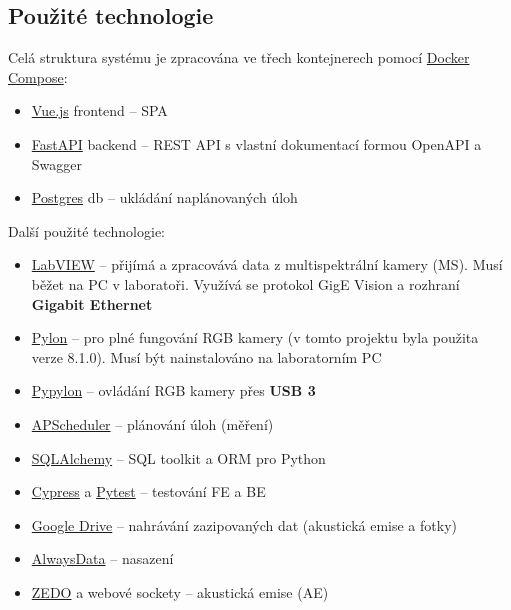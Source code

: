 \documentclass[12pt]{article}
\begin{document}
\begin{teamwork}
        \subsection{Použité technologie}\label{subsec:techstack}

        Celá struktura systému je zpracována ve třech kontejnerech pomocí \href{https://docs.docker.com/compose/}{Docker Compose}:

        \begin{itemize}
            \item \href{https://vuejs.org/}{Vue.js} frontend – SPA
            \item \href{https://fastapi.tiangolo.com/}{FastAPI} backend – REST API s vlastní dokumentací formou OpenAPI a Swagger
            \item \href{https://www.postgresql.org/}{Postgres} db – ukládání naplánovaných úloh
        \end{itemize}

        Další použité technologie:

        \begin{itemize}
            \item \href{https://www.ni.com/en/shop/labview.html}{LabVIEW} – přijímá a zpracovává data z multispektrální kamery (MS). Musí běžet na PC v laboratoři.
            Využívá se protokol GigE Vision a rozhraní \textbf{Gigabit Ethernet}
            \item \href{https://www.baslerweb.com/en/downloads/software/?downloadCategory.values.label.data=pylon}{Pylon} – pro plné fungování RGB kamery (v tomto projektu byla použita verze 8.1.0).
            Musí být nainstalováno na laboratorním PC
            \item \href{https://github.com/basler/pypylon}{Pypylon} – ovládání RGB kamery přes \textbf{USB 3}
            \item \href{https://github.com/agronholm/apscheduler}{APScheduler} – plánování úloh (měření)
            \item \href{https://www.sqlalchemy.org/}{SQLAlchemy} – SQL toolkit a ORM pro Python
            \item \href{https://www.cypress.io/}{Cypress} a \href{https://docs.pytest.org/en/stable/}{Pytest} – testování FE a BE
            \item \href{https://workspace.google.com/products/drive/}{Google Drive} – nahrávání zazipovaných dat (akustická emise a fotky)
            \item \href{https://www.alwaysdata.com/en/}{AlwaysData} – nasazení
            \item \href{http://dakel.cz/index.php?pg=prod/dev/zedo_en}{ZEDO} a webové sockety – akustická emise (AE)
        \end{itemize}


\end{teamwork}
\end{document}

